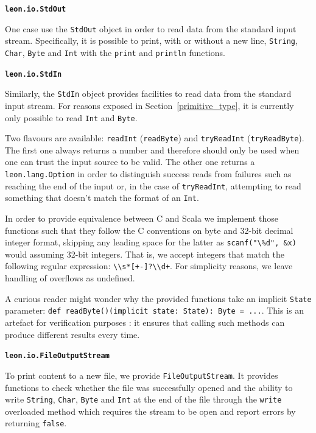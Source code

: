 \documentclass[a4paper,twoside]{article}
\newcommand{\Inline}[1]{\lstinline[basicstyle=\ttfamily]|#1|}
\newcommand{\InlineC}[1]{\lstinline[language=C99]|#1|}
\newcommand{\InlineS}[1]{\lstinline[language=Leon]|#1|}
\newcommand*{\lstitem}[1]{
  \setbox0\hbox{\textbf{\Inline{#1}}}
  \item[\usebox0]
}
\newcommand{\RefSec}[1]{Section~\ref{#1}}
\begin{document}
\begin{description}

\lstitem{leon.io.StdOut}

One case use the \InlineS{StdOut} object in order to read data from the standard
input stream. Specifically, it is possible to print, with or without a new line,
\InlineS{String}, \InlineS{Char}, \InlineS{Byte} and \InlineS{Int} with the
\InlineS{print} and \InlineS{println} functions.

\lstitem{leon.io.StdIn}

Similarly, the \InlineS{StdIn} object provides facilities to read data from the
standard input stream. For reasons exposed in \RefSec{primitive_type}, it is
currently only possible to read \InlineS{Int} and \InlineS{Byte}.

Two flavours are available: \InlineS{readInt} (\InlineS{readByte}) and
\InlineS{tryReadInt} (\InlineS{tryReadByte}). The first one always returns a
number and therefore should only be used when one can trust the input source to
be valid. The other one returns a \InlineS{leon.lang.Option} in order to
distinguish success reads from failures such as reaching the end of the input
or, in the case of \InlineS{tryReadInt}, attempting to read something that
doesn't match the format of an \InlineS{Int}.

In order to provide equivalence between C and Scala we implement those functions
such that they follow the C conventions on byte and 32-bit decimal integer
format, skipping any leading space for the latter as \InlineC{scanf("\%d", &x)}
would assuming 32-bit integers. That is, we accept integers that match the
following regular expression: \Inline{\\s*[+-]?\\d+}. For simplicity reasons, we
leave handling of overflows as undefined.

A curious reader might wonder why the provided functions take an implicit
\InlineS{State} parameter: \InlineS{def readByte()(implicit state: State): Byte
= ...}. This is an artefact for verification purposes \cite{xlang}: it ensures
that calling such methods can produce different results every time.

\lstitem{leon.io.FileOutputStream}

To print content to a new file, we provide \InlineS{FileOutputStream}. It
provides functions to check whether the file was successfully opened and the
ability to write \InlineS{String}, \InlineS{Char}, \InlineS{Byte} and
\InlineS{Int} at the end of the file through the \InlineS{write} overloaded
method which requires the stream to be open and report errors by returning
\InlineS{false}.


\end{description}
\end{document}
